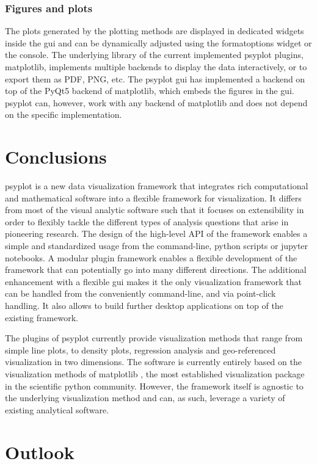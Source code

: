 \begin{refsection}
\subsubsection{Figures and plots}
The plots generated by the plotting methods are displayed in dedicated widgets inside the \gls{gui} and can be dynamically adjusted using the formatoptions widget or the console. The underlying library of the current implemented psyplot plugins, matplotlib, implements multiple backends to display the data interactively, or to export them as PDF, PNG, etc. The psyplot \gls{gui} has implemented a backend on top of the PyQt5 backend of matplotlib, which embeds the figures in the \gls{gui}. psyplot can, however, work with any backend of matplotlib and does not depend on the specific implementation.

\section{Conclusions}  \label{sec:psyplot-conclusions}
psyplot \citep{Sommer2017} is a new data visualization framework that integrates rich computational and mathematical software into a flexible framework for visualization. It differs from most of the visual analytic software such that it focuses on extensibility in order to flexibly tackle the different types of analysis questions that arise in pioneering research. The design of the high-level API of the framework enables a simple and standardized usage from the command-line, python scripts or jupyter notebooks. A modular plugin framework enables a flexible development of the framework that can potentially go into many different directions. The additional enhancement with a flexible \gls{gui} makes it the only visualization framework that can be handled from the conveniently command-line, and via point-click handling. It also allows to build further desktop applications on top of the existing framework.

The plugins of psyplot currently provide visualization methods that range from simple line plots, to density plots, regression analysis and geo-referenced visualization in two dimensions. The software is currently entirely based on the visualization methods of matplotlib \citep{Hunter2007}, the most established visualization package in the scientific python community. However, the framework itself is agnostic to the underlying visualization method and can, as such, leverage a variety of existing analytical software.

\section{Outlook}  \label{sec:psyplot-outlook}


\end{refsection}
